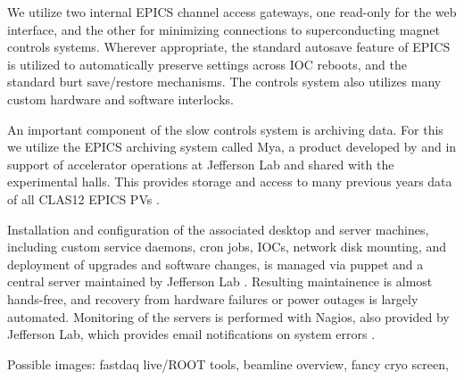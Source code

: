 We utilize two internal EPICS channel access gateways, one read-only for the web interface, and the other for minimizing connections to superconducting magnet controls systems.  Wherever appropriate, the standard autosave feature of EPICS is utilized to automatically preserve settings across IOC reboots, and the standard burt save/restore mechanisms.  The controls system also utilizes many custom hardware and software interlocks.

An important component of the slow controls system is archiving data.  For this we utilize the EPICS archiving system called Mya, a product developed by and in support of accelerator operations at Jefferson Lab and shared with the experimental halls.  This provides storage and access to many previous years data of all CLAS12 EPICS PVs \cite{mya}.

Installation and configuration of the associated desktop and server machines, including custom service daemons, cron jobs, IOCs, network disk mounting, and deployment of upgrades and software changes, is managed via puppet and a central server maintained by Jefferson Lab \cite{puppet-website}.  Resulting maintainence is almost hands-free, and recovery from hardware failures or power outages is largely automated.  Monitoring of the servers is performed with Nagios, also provided by Jefferson Lab, which provides email notifications on system errors \cite{nagios-website}.


Possible images:  fastdaq live/ROOT tools, beamline overview, fancy cryo screen, 

